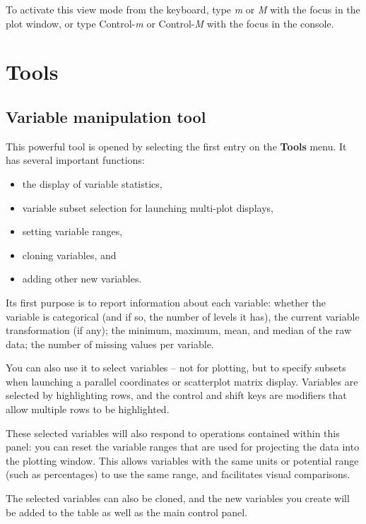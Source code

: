 \documentclass[11pt]{article}
\begin{document}
To activate this view mode from the keyboard, type {\em m} or {\em M}
with the focus in the plot window, or type Control-{\em m} or
Control-{\em M} with the focus in the console.

\newpage
\section{Tools}
\label{Tools}

\subsection{Variable manipulation tool}
\label{slbl:VarManip}

This powerful tool is opened by selecting the first entry on the
{\bf Tools} menu.  It has several important functions:
\begin{itemize}
\itemsep 0em
\item the display of variable statistics,
\item variable subset selection for launching multi-plot displays,
\item setting variable ranges,
\item cloning variables, and
\item adding other new variables.
\end{itemize}

Its first purpose is to report information about each variable:
whether the variable is categorical (and if so, the number of levels
it has), the current variable transformation (if any); the minimum,
maximum, mean, and median of the raw data; the number of missing values
per variable.

You can also use it to select variables -- not for plotting, but to
specify subsets when launching a parallel coordinates or scatterplot
matrix display.  Variables are selected by highlighting rows, and the
control and shift keys are modifiers that allow multiple rows to be
highlighted.

These selected variables will also respond to operations contained
within this panel:  you can reset the variable ranges that are used
for projecting the data into the plotting window.  This allows
variables with the same units or potential range (such as percentages)
to use the same range, and facilitates visual comparisons.

The selected variables can also be cloned, and the new variables
you create will be added to the table as well as the main control panel.
\end{document}
